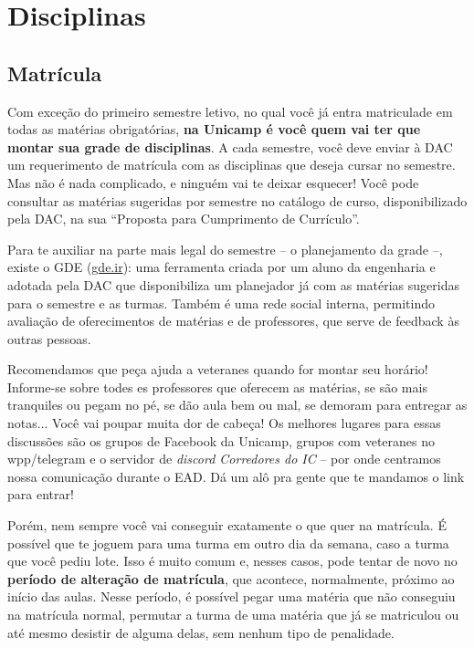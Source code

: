 \section{Disciplinas}

\subsection{Matrícula}

Com exceção do primeiro semestre letivo, no qual você já entra matriculade em todas as matérias obrigatórias, \textbf{na Unicamp é você quem vai ter que montar sua grade de disciplinas}. A cada semestre, você deve enviar à DAC um requerimento de matrícula com as disciplinas que deseja cursar no semestre. Mas não é nada complicado, e ninguém vai te deixar esquecer! Você pode consultar as matérias sugeridas por semestre no catálogo de curso, disponibilizado pela DAC, na sua “Proposta para Cumprimento de Currículo”.

Para te auxiliar na parte mais legal do semestre – o planejamento da grade –, existe o GDE (\url{gde.ir}): uma ferramenta criada por um aluno da engenharia e adotada pela DAC que disponibiliza um planejador já com as matérias sugeridas para o semestre e as turmas. Também é uma rede social interna, permitindo avaliação de oferecimentos de matérias e de professores, que serve de feedback às outras pessoas.

Recomendamos que peça ajuda a veteranes quando for montar seu horário! Informe-se sobre todes es professores que oferecem as matérias, se são mais tranquiles ou pegam no pé, se dão aula bem ou mal, se demoram para entregar as notas... Você vai poupar muita dor de cabeça! Os melhores lugares para essas discussões são os grupos de Facebook da Unicamp, grupos com veteranes no wpp/telegram e o servidor de \textit{discord Corredores do IC} – por onde centramos nossa comunicação durante o EAD. Dá um alô pra gente que te mandamos o link para entrar!

Porém, nem sempre você vai conseguir exatamente o que quer na matrícula. É possível que te joguem para uma turma em outro dia da semana, caso a turma que você pediu lote. Isso é muito comum e, nesses casos, pode tentar de novo no \textbf{período de alteração de matrícula}, que acontece, normalmente, próximo ao início das aulas. Nesse período, é possível pegar uma matéria que não conseguiu na matrícula normal, permutar a turma de uma matéria que já se matriculou ou até mesmo desistir de alguma delas, sem nenhum tipo de penalidade.

